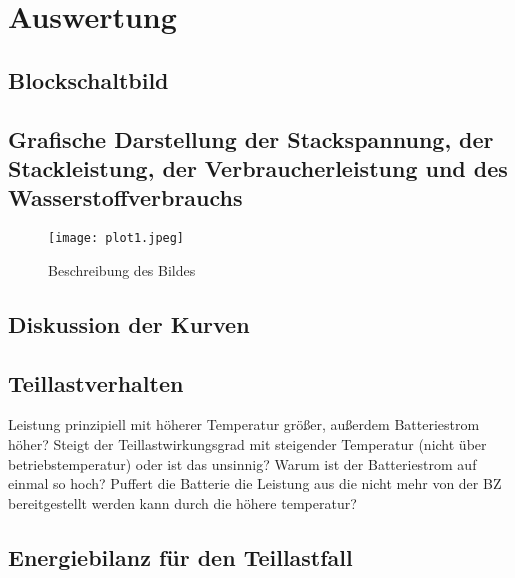 \section{Auswertung}
\label{sec:Auswertung}


\subsection{Blockschaltbild}
\subsection{Grafische Darstellung der Stackspannung, der
Stackleistung, der Verbraucherleistung und des Wasserstoffverbrauchs}
\begin{figure}
    \centering
    \texttt{[image: plot1.jpeg]}
    \caption{Beschreibung des Bildes}
    \label{fig:plot1}
  \end{figure}
\subsection{}
\subsection{Diskussion der Kurven}
\subsection{}
\subsection{Teillastverhalten}

Leistung prinzipiell mit höherer Temperatur größer, außerdem Batteriestrom höher? 
Steigt der Teillastwirkungsgrad mit steigender Temperatur (nicht über betriebstemperatur) oder ist das unsinnig?
Warum ist der Batteriestrom auf einmal so hoch? Puffert die Batterie die Leistung aus die nicht mehr von der BZ bereitgestellt werden kann durch die höhere temperatur?



\subsection{Energiebilanz für den Teillastfall}